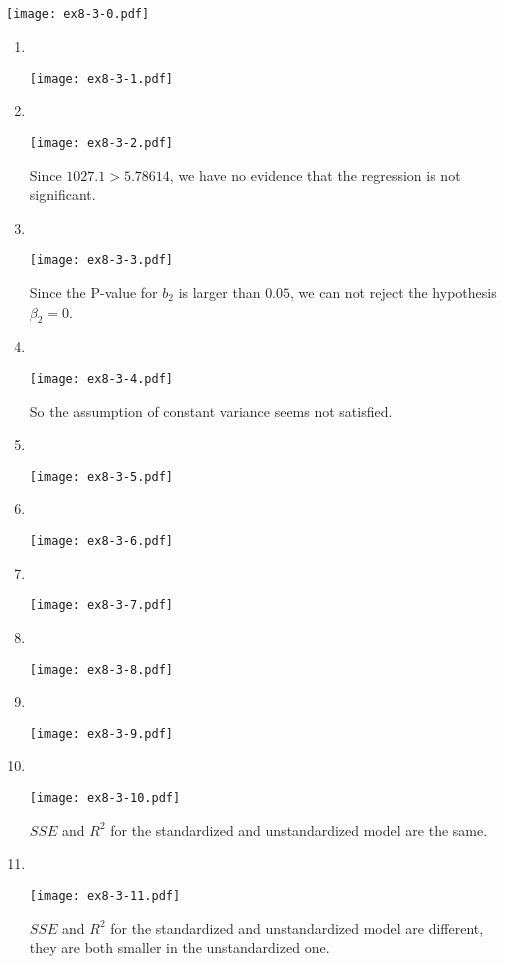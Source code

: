 \documentclass[11pt,a4paper]{article}
\begin{document}
\subsection{}
\texttt{[image: ex8-3-0.pdf]}
\begin{enumerate}[label=\roman*)]
\item\ 

\texttt{[image: ex8-3-1.pdf]}
\item\ 

\texttt{[image: ex8-3-2.pdf]}

Since $1027.1>5.78614$, we have no evidence that the regression is not significant.
\item\ 

\texttt{[image: ex8-3-3.pdf]}

Since the P-value for $b_2$ is larger than $0.05$, we can not reject the hypothesis $\beta_2=0$.
\item\ 

\texttt{[image: ex8-3-4.pdf]}

So the assumption of constant variance seems not satisfied.
\item\ 

\texttt{[image: ex8-3-5.pdf]}
\item\ 

\texttt{[image: ex8-3-6.pdf]}
\item\ 

\texttt{[image: ex8-3-7.pdf]}
\item\ 

\texttt{[image: ex8-3-8.pdf]}
\item\ 

\texttt{[image: ex8-3-9.pdf]}
\item\ 

\texttt{[image: ex8-3-10.pdf]}

$SSE$ and $R^2$ for the standardized and unstandardized model are the same.
\item\ 

\texttt{[image: ex8-3-11.pdf]}

$SSE$ and $R^2$ for the standardized and unstandardized model are different, they are both smaller in the unstandardized one.
\end{enumerate}
\end{document}
